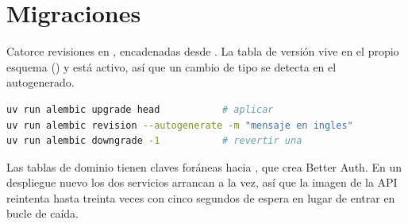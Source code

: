 \section{Migraciones}

Catorce revisiones en , encadenadas desde
. La tabla de versión vive en el propio esquema
() y  está activo,
así que un cambio de tipo se detecta en el autogenerado.

\begin{lstlisting}[language=bash]
uv run alembic upgrade head           # aplicar
uv run alembic revision --autogenerate -m "mensaje en ingles"
uv run alembic downgrade -1           # revertir una
\end{lstlisting}

\begin{pkwarn}
Las tablas de dominio tienen claves foráneas hacia , que crea
Better Auth. En un despliegue nuevo los dos servicios arrancan a la vez, así que
la imagen de la API reintenta  hasta treinta veces
con cinco segundos de espera en lugar de entrar en bucle de caída.
\end{pkwarn}
